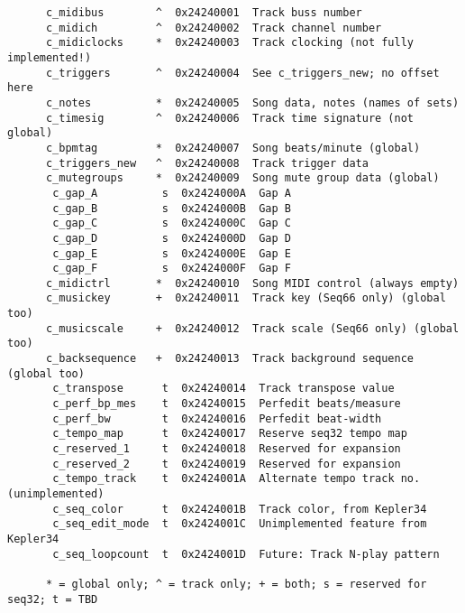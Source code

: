    \begin{verbatim}
      c_midibus        ^  0x24240001  Track buss number
      c_midich         ^  0x24240002  Track channel number
      c_midiclocks     *  0x24240003  Track clocking (not fully implemented!)
      c_triggers       ^  0x24240004  See c_triggers_new; no offset here
      c_notes          *  0x24240005  Song data, notes (names of sets)
      c_timesig        ^  0x24240006  Track time signature (not global)
      c_bpmtag         *  0x24240007  Song beats/minute (global)
      c_triggers_new   ^  0x24240008  Track trigger data
      c_mutegroups     *  0x24240009  Song mute group data (global)
	   c_gap_A          s  0x2424000A  Gap A
	   c_gap_B          s  0x2424000B  Gap B
	   c_gap_C          s  0x2424000C  Gap C
	   c_gap_D          s  0x2424000D  Gap D
	   c_gap_E          s  0x2424000E  Gap E
	   c_gap_F          s  0x2424000F  Gap F
      c_midictrl       *  0x24240010  Song MIDI control (always empty)
      c_musickey       +  0x24240011  Track key (Seq66 only) (global too)
      c_musicscale     +  0x24240012  Track scale (Seq66 only) (global too)
      c_backsequence   +  0x24240013  Track background sequence (global too)
	   c_transpose      t  0x24240014  Track transpose value
	   c_perf_bp_mes    t  0x24240015  Perfedit beats/measure
	   c_perf_bw        t  0x24240016  Perfedit beat-width
	   c_tempo_map      t  0x24240017  Reserve seq32 tempo map
	   c_reserved_1     t  0x24240018  Reserved for expansion
	   c_reserved_2     t  0x24240019  Reserved for expansion
	   c_tempo_track    t  0x2424001A  Alternate tempo track no. (unimplemented)
	   c_seq_color      t  0x2424001B  Track color, from Kepler34
	   c_seq_edit_mode  t  0x2424001C  Unimplemented feature from Kepler34
	   c_seq_loopcount  t  0x2424001D  Future: Track N-play pattern

      * = global only; ^ = track only; + = both; s = reserved for seq32; t = TBD
   \end{verbatim}

